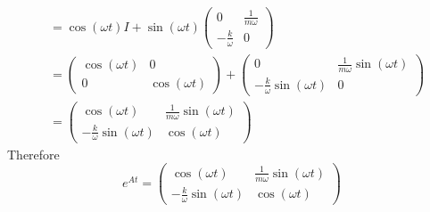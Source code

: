 \documentclass{article}
\begin{document}
\begin{enumerate}
\begin{align*}
&=\cos\left( \omega t \right) I+ \sin\left( \omega t \right)\begin{pmatrix}
	0&\frac1{m\omega}\\
	-\frac{k}{\omega}&0
\end{pmatrix}\\
&=\begin{pmatrix}
	\cos\left( \omega t \right) &0\\
	0&\cos\left( \omega t \right) 
\end{pmatrix}+\begin{pmatrix}
	0&\frac1{m\omega}\sin\left( \omega t \right)\\
	-\frac{k}{\omega}\sin\left(\omega t \right)&0
\end{pmatrix}\\
&=\begin{pmatrix}
	\cos\left(\omega t \right) &\frac1{m\omega}\sin\left( \omega t \right)\\
	-\frac{k}{\omega}\sin\left(\omega t \right)&	\cos\left( \omega t \right) 
\end{pmatrix}
\end{align*}
Therefore$$e^{At}=\begin{pmatrix}
\cos\left(\omega t \right) &\frac1{m\omega}\sin\left( \omega t \right)\\
-\frac{k}{\omega}\sin\left(\omega t \right)&	\cos\left( \omega t \right) 
\end{pmatrix}$$
\end{enumerate}
\end{document}
